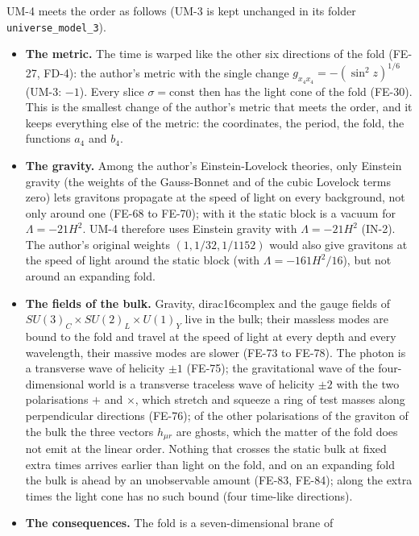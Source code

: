 \documentclass[
  10pt,
]{article}
\providecommand{\tightlist}{%
  \setlength{\itemsep}{0pt}\setlength{\parskip}{0pt}}
\begin{document}
UM-4 meets the order as follows (UM-3 is kept unchanged in its folder
\texttt{universe\_model\_3}).

\begin{itemize}
\tightlist
\item
  \textbf{The metric.} The time is warped like the other six directions
  of the fold (FE-27, FD-4): the author's metric with the single change
  \(g_{x_4x_4} = -(\sin^2z)^{1/6}\) (UM-3: \(-1\)). Every slice
  \(\sigma = \text{const}\) then has the light cone of the fold (FE-30).
  This is the smallest change of the author's metric that meets the
  order, and it keeps everything else of the metric: the coordinates,
  the period, the fold, the functions \(a_4\) and \(b_4\).
\item
  \textbf{The gravity.} Among the author's Einstein-Lovelock theories,
  only Einstein gravity (the weights of the Gauss-Bonnet and of the
  cubic Lovelock terms zero) lets gravitons propagate at the speed of
  light on every background, not only around one (FE-68 to FE-70); with
  it the static block is a vacuum for \(\Lambda = -21H^2\). UM-4
  therefore uses Einstein gravity with \(\Lambda = -21H^2\) (IN-2). The
  author's original weights \((1, 1/32, 1/1152)\) would also give
  gravitons at the speed of light around the static block (with
  \(\Lambda = -161H^2/16\)), but not around an expanding fold.
\item
  \textbf{The fields of the bulk.} Gravity, dirac16complex and the gauge
  fields of \(SU(3)_C \times SU(2)_L \times U(1)_Y\) live in the bulk;
  their massless modes are bound to the fold and travel at the speed of
  light at every depth and every wavelength, their massive modes are
  slower (FE-73 to FE-78). The photon is a transverse wave of helicity
  \(\pm1\) (FE-75); the gravitational wave of the four-dimensional world
  is a transverse traceless wave of helicity \(\pm2\) with the two
  polarisations \(+\) and \(\times\), which stretch and squeeze a ring
  of test masses along perpendicular directions (FE-76); of the other
  polarisations of the graviton of the bulk the three vectors
  \(h_{\mu r}\) are ghosts, which the matter of the fold does not emit
  at the linear order. Nothing that crosses the static bulk at fixed
  extra times arrives earlier than light on the fold, and on an
  expanding fold the bulk is ahead by an unobservable amount (FE-83,
  FE-84); along the extra times the light cone has no such bound (four
  time-like directions).
\item
  \textbf{The consequences.} The fold is a seven-dimensional brane of

\end{itemize}
\end{document}
